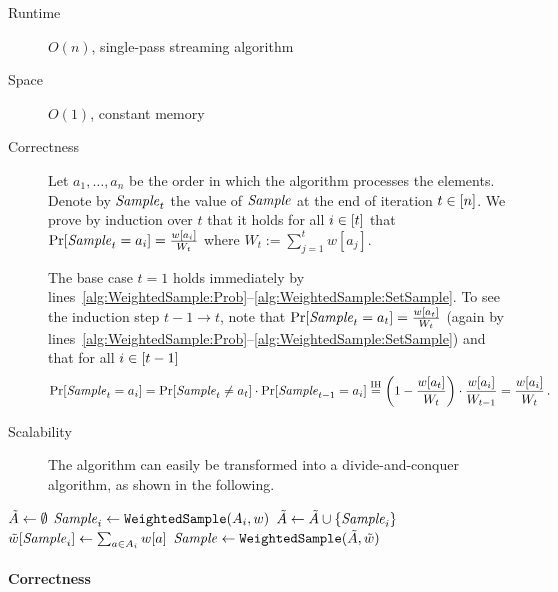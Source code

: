 \begin{description}
	\item[Runtime] $O(n)$, single-pass streaming algorithm
	\item[Space] $O(1)$, constant memory
	\item[Correctness]
		Let $a_1, \dots, a_n$ be the order in which the algorithm processes the elements. Denote by $\mathit{Sample}_t$ the value of $\mathit{Sample}$ at the end of iteration $t \in \Nupto n$. We prove by induction over $t$ that it holds for all $i \in \Nupto t$ that $\Pr[\mathit{Sample}_t = a_i] = \frac{w[a_i]}{W_t}$ where $W_t := \sum_{j=1}^t w[a_j]$.

		The base case $t = 1$ holds immediately by lines~\ref{alg:WeightedSample:Prob}--\ref{alg:WeightedSample:SetSample}. To see the induction step $t - 1 \to t$, note that $\Pr[\mathit{Sample}_t = a_t] = \frac{w[a_t]}{W_t}$ (again by lines~\ref{alg:WeightedSample:Prob}--\ref{alg:WeightedSample:SetSample}) and that for all $i \in \Nupto{t-1}$
		\begin{align*}
			\Pr[\Sample_t = a_i]
			=	\Pr[\Sample_t \neq a_t] \cdot \Pr[\Sample_{t-1} = a_i]
			\stackrel{\text{IH}}{=}
				\left(1 - \frac{w[a_t]}{W_t}\right) \cdot \frac{w[a_i]}{W_{t-1}}
			=	\frac{w[a_i]}{W_t}
			\SiM.
		\end{align*}
	\item[Scalability]
		The algorithm can easily be transformed into a divide-and-conquer algorithm, as shown in the following.
\end{description}

\begin{algorithm}[RecursiveWeightedSample$(A_1, A_2, w)$] \label{alg:RecursiveWeightedSample}
\begin{algorithmic}[1]
	\State $\tilde A \leftarrow \emptyset$
		\State $\mathit{Sample}_i \leftarrow \texttt{WeightedSample}(A_i, w)$
		\State $\tilde A \leftarrow \tilde A \cup \{ \mathit{Sample}_i \}$
		\State $\tilde w[\mathit{Sample}_i] \leftarrow \sum_{a \in A_i} w[a]$
	\EndFor
	\State $\mathit{Sample} \leftarrow \texttt{WeightedSample}(\tilde A, \tilde w)$
\end{algorithmic}
\end{algorithm}

\paragraph{Correctness}

